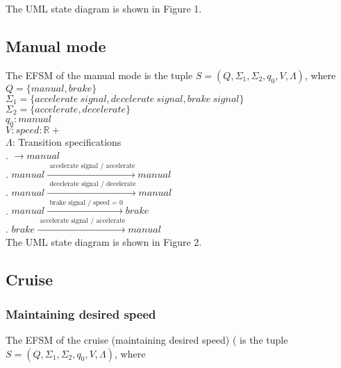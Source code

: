 \documentclass[12pt]{article}
\begin{document}
\begin{spacing}{1.5}
\noindent The UML state diagram is shown in Figure 1.

\newpage

\subsection{Manual mode}

\noindent The EFSM of the manual mode is the tuple $S = (Q, \Sigma_1, \Sigma_2, q_0, V, \Lambda)$, where\\

\noindent $Q = \{manual, brake\}$\\
\noindent $\Sigma_1 = \{accelerate~signal, decelerate~signal, brake~signal\}$\\
\noindent $\Sigma_2 = \{accelerate, decelerate\}$\\
\noindent $q_0: manual$\\
\noindent $V: speed: \mathbb{R+} $\\
\noindent $\Lambda$: Transition specifications\\
. $\rightarrow manual$\\
. $manual \xrightarrow {\text { accelerate signal / accelerate}} manual$\\
. $manual \xrightarrow {\text { decelerate signal / decelerate}} manual$\\
. $manual \xrightarrow {\text { brake signal / speed = 0}} brake$\\
. $brake \xrightarrow {\text { accelerate signal / accelerate}} manual$\\


\noindent The UML state diagram is shown in Figure 2.

\newpage
\subsection{Cruise}
\subsubsection{Maintaining desired speed}

\noindent The EFSM of the cruise (maintaining desired speed) ( is the tuple $S = (Q, \Sigma_1, \Sigma_2, q_0, V, \Lambda)$, where\\


\end{spacing}
\end{document}

